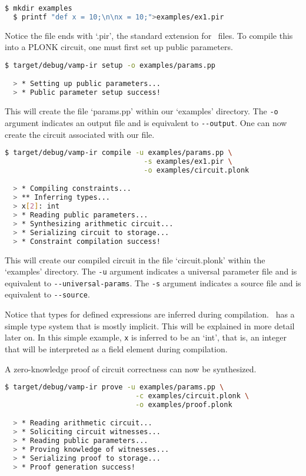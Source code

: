 \begin{lstlisting}[language=bash]
  $ mkdir examples
  $ printf "def x = 10;\n\nx = 10;">examples/ex1.pir
\end{lstlisting}

Notice the file ends with `.pir', the standard extension for \vampir\ files. To compile this into a PLONK circuit, one must first set up public parameters.

\begin{lstlisting}[language=bash]
  $ target/debug/vamp-ir setup -o examples/params.pp

  > * Setting up public parameters...
  > * Public parameter setup success!
\end{lstlisting}

This will create the file `params.pp' within our `examples' directory. The \lstinline{-o} argument indicates an output file and is equivalent to \lstinline{--output}. One can now create the circuit associated with our file.


\begin{lstlisting}[language=bash]
  $ target/debug/vamp-ir compile -u examples/params.pp \
                                 -s examples/ex1.pir \
                                 -o examples/circuit.plonk

  > * Compiling constraints...
  > ** Inferring types...
  > x[2]: int
  > * Reading public parameters...
  > * Synthesizing arithmetic circuit...
  > * Serializing circuit to storage...
  > * Constraint compilation success!
\end{lstlisting}

This will create our compiled circuit in the file `circuit.plonk' within the `examples' directory. The \lstinline{-u} argument indicates a universal parameter file and is equivalent to \lstinline{--universal-params}. The \lstinline{-s} argument indicates a source file and is equivalent to \lstinline{--source}.

Notice that types for defined expressions are inferred during compilation. \vampir\ has a simple type system that is mostly implicit. This will be explained in more detail later on. In this simple example, \lstinline{x} is inferred to be an `int', that is, an integer that will be interpreted as a field element during compilation.

A zero-knowledge proof of circuit correctness can now be synthesized.

\begin{lstlisting}[language=bash]
  $ target/debug/vamp-ir prove -u examples/params.pp \
                               -c examples/circuit.plonk \
                               -o examples/proof.plonk

  > * Reading arithmetic circuit...
  > * Soliciting circuit witnesses...
  > * Reading public parameters...
  > * Proving knowledge of witnesses...
  > * Serializing proof to storage...
  > * Proof generation success!
\end{lstlisting}

